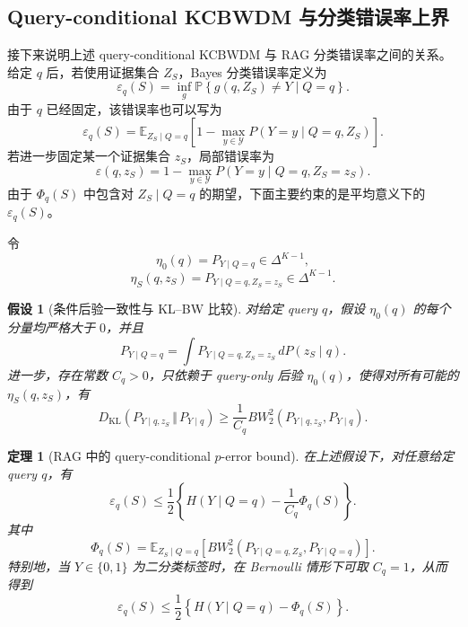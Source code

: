 \documentclass[UTF8,a4paper,12pt,oneside]{ctexart}
\newtheorem{assumption}{假设}
\newtheorem{theorem}{定理}
\numberwithin{equation}{section}
\begin{document}
\subsection{Query-conditional KCBWDM 与分类错误率上界}

接下来说明上述 query-conditional KCBWDM 与 RAG 分类错误率之间的关系。
给定 \(q\) 后，若使用证据集合 \(Z_S\)，Bayes 分类错误率定义为
\[
    \varepsilon_q(S)
    =
    \inf_g
    \mathbb P
    \left\{
        g(q,Z_S)\neq Y
        \mid Q=q
    \right\}.
\]
由于 \(q\) 已经固定，该错误率也可以写为
\[
    \varepsilon_q(S)
    =
    \mathbb E_{Z_S\mid Q=q}
    \left[
        1-
        \max_{y\in\mathcal Y}
        P(Y=y\mid Q=q,Z_S)
    \right].
\]
若进一步固定某一个证据集合 \(z_S\)，局部错误率为
\[
    \varepsilon(q,z_S)
    =
    1-
    \max_{y\in\mathcal Y}
    P(Y=y\mid Q=q,Z_S=z_S).
\]
由于 \(\Phi_q(S)\) 中包含对 \(Z_S\mid Q=q\) 的期望，下面主要约束的是平均意义下的
\(\varepsilon_q(S)\)。

令
\[
    \eta_0(q)
    =
    P_{Y\mid Q=q}
    \in \Delta^{K-1},
\]
\[
    \eta_S(q,z_S)
    =
    P_{Y\mid Q=q,Z_S=z_S}
    \in \Delta^{K-1}.
\]

\begin{assumption}[条件后验一致性与 KL--BW 比较]
对给定 query \(q\)，假设 \(\eta_0(q)\) 的每个分量均严格大于 \(0\)，并且
\[
    P_{Y\mid Q=q}
    =
    \int
    P_{Y\mid Q=q,Z_S=z_S}
    \,dP(z_S\mid q).
\]
进一步，存在常数 \(C_q>0\)，只依赖于 query-only 后验 \(\eta_0(q)\)，使得对所有可能的
\(\eta_S(q,z_S)\)，有
\[
    D_{\mathrm{KL}}
    \left(
        P_{Y\mid q,z_S}
        \,\Vert\,
        P_{Y\mid q}
    \right)
    \ge
    \frac{1}{C_q}
    BW_2^2
    \left(
        P_{Y\mid q,z_S},
        P_{Y\mid q}
    \right).
\]
\end{assumption}

\begin{theorem}[RAG 中的 query-conditional \(p\)-error bound]
在上述假设下，对任意给定 query \(q\)，有
\[
    \varepsilon_q(S)
    \le
    \frac{1}{2}
    \left\{
        H(Y\mid Q=q)
        -
        \frac{1}{C_q}
        \Phi_q(S)
    \right\}.
\]
其中
\[
    \Phi_q(S)
    =
    \mathbb E_{Z_S\mid Q=q}
    \left[
        BW_2^2
        \left(
            P_{Y\mid Q=q,Z_S},
            P_{Y\mid Q=q}
        \right)
    \right].
\]
特别地，当 \(Y\in\{0,1\}\) 为二分类标签时，在 Bernoulli 情形下可取 \(C_q=1\)，从而得到
\[
    \varepsilon_q(S)
    \le
    \frac{1}{2}
    \left\{
        H(Y\mid Q=q)
        -
        \Phi_q(S)
    \right\}.
\]
\end{theorem}
\end{document}
